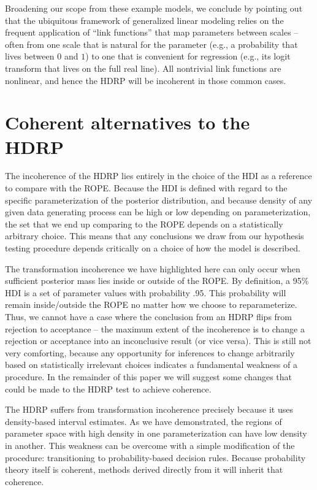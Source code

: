 \documentclass[9pt,twocolumn,twoside]{cidlab-draft}\templatetype{cidlab-invited}
\newcommand{\hdr}{HDRP}
\begin{document}
Broadening our scope from these example models, we conclude by pointing out that the ubiquitous framework of generalized linear modeling relies on the frequent application of ``link functions'' that map parameters between scales -- often from one scale that is natural for the parameter (e.g., a probability that lives between $0$ and $1$) to one that is convenient for regression (e.g., its logit transform that lives on the full real line).  All nontrivial link functions are nonlinear, and hence the \hdr{} will be incoherent in those common cases.

\section*{Coherent alternatives to the \hdr{}}

The incoherence of the \hdr{} lies entirely in the choice of the HDI as a reference to compare with the ROPE. Because the HDI is defined with regard to the specific parameterization of the posterior distribution, and because density of any given data generating process can be high or low depending on parameterization, the set that we end up comparing to the ROPE depends on a statistically arbitrary choice. This means that any conclusions we draw from our hypothesis testing procedure depends critically on a choice of how the model is described. 

The transformation incoherence we have highlighted here can only occur when sufficient posterior mass lies inside or outside of the ROPE. By definition, a 95\% HDI is a set of parameter values with probability .95. This probability will remain inside/outside the ROPE no matter how we choose to reparameterize. Thus, we cannot have a case where the conclusion from an \hdr{} flips from rejection to acceptance -- the maximum extent of the incoherence is to change a rejection or acceptance into an inconclusive result (or vice versa). This is still not very comforting, because any opportunity for inferences to change arbitrarily based on statistically irrelevant choices indicates a fundamental weakness of a procedure. In the remainder of this paper we will suggest some changes that could be made to the \hdr{} test to achieve coherence.

The \hdr{} suffers from transformation incoherence precisely because it uses density-based interval estimates. As we have demonstrated, the regions of parameter space with high density in one parameterization can have low density in another. This weakness can be overcome with a simple modification of the procedure: transitioning to probability-based decision rules. Because probability theory itself is coherent, methods derived directly from it will inherit that coherence. 
\end{document}
